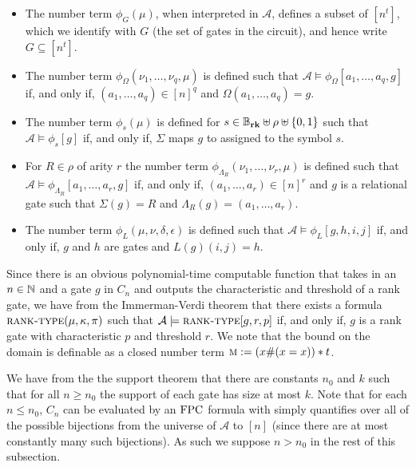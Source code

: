 \documentclass[../paper.tex]{subfiles}
\begin{document}
\begin{itemize}
	\setlength\itemsep{0mm}
\item The number term $\phi_G(\mu)$, when interpreted in $\mathcal{A}$, defines
  a subset of $[n^t]$, which we identify with $G$ (the set of gates in the
  circuit), and hence write $G \subseteq [n^t]$.
\item The number term $\phi_{\Omega}(\nu_1, \ldots , \nu_q, \mu)$ is defined
  such that $\mathcal{A} \models \phi_\Omega[a_1, \ldots, a_q, g]$ if, and only
  if, $(a_1, \ldots, a_q) \in [n]^q$ and $\Omega(a_1, \ldots, a_q) = g$.
\item The number term $\phi_s (\mu)$ is defined for $s \in \mathbb{B}_{\text{\textbf{rk}}} \uplus \rho
  \uplus \{0,1\}$ such that $\mathcal{A} \models \phi_s [g]$ if, and only if,
  $\Sigma$ maps $g$ to assigned to the symbol $s$.
	      	      
\item For $R \in \rho$ of arity $r$ the number term $\phi_{\Lambda_R}(\nu_1,
  \ldots, \nu_r, \mu)$ is defined such that $\mathcal{A} \models
  \phi_{\Lambda_R} [a_1, \ldots, a_r, g]$ if, and only if, $(a_1, \ldots,
  a_r)\in [n]^r$ and $g$ is a relational gate such that $\Sigma (g) = R$ and
  $\Lambda_R (g) = (a_1, \ldots, a_r)$.
\item The number term $\phi_L(\mu, \nu, \delta, \epsilon)$ is defined such that
  $\mathcal{A} \models \phi_L[g,h,i,j]$ if, and only if, $g$ and $h$ are gates
  and $L(g)(i,j) = h$.
\end{itemize}

Since there is an obvious polynomial-time computable function that takes in an
$n \in \mathbb{N}$ and a gate $g$ in $C_n$ and outputs the characteristic and
threshold of a rank gate, we have from the Immerman-Verdi theorem that there
exists a formula $\textsc{rank-type}(\mu, \kappa , \pi)$ such that $\mathcal{A}
\models \textsc{rank-type}[g, r, p]$ if, and only if, $g$ is a rank gate with
characteristic $p$ and threshold $r$. We note that the bound on the domain is
definable as a closed number term $\textsc{m} := (x\# (x = x))*t$.

We have from the the support theorem that there are constants $n_0$ and $k$ such
that for all $n \geq n_0$ the support of each gate has size at most $k$. Note
that for each $n \leq n_0$, $C_n$ can be evaluated by an $\text{\upshape FPC}$ formula with
simply quantifies over all of the possible bijections from the universe of
$\mathcal{A}$ to $[n]$ (since there are at most constantly many such
bijections). As such we suppose $n > n_0$ in the rest of this subsection.
\end{document}
